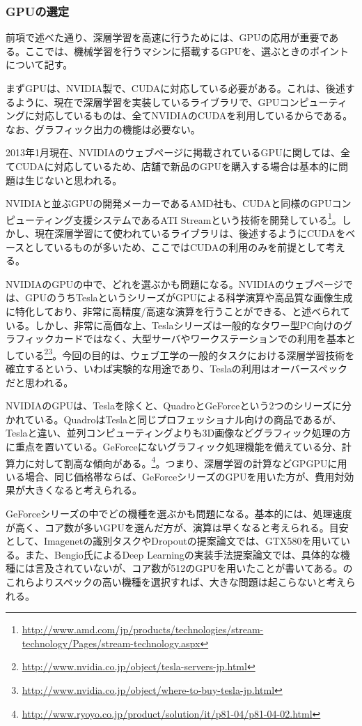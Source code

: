 \subsubsection{GPUの選定}
前項で述べた通り、深層学習を高速に行うためには、GPUの応用が重要である。ここでは、機械学習を行うマシンに搭載するGPUを、選ぶときのポイントについて記す。\par
まずGPUは、NVIDIA製で、CUDAに対応している必要がある。これは、後述するように、現在で深層学習を実装しているライブラリで、GPUコンピューティングに対応しているものは、全てNVIDIAのCUDAを利用しているからである。なお、グラフィック出力の機能は必要ない。\par2013年1月現在、NVIDIAのウェブページに掲載されているGPUに関しては、全てCUDAに対応しているため、店舗で新品のGPUを購入する場合は基本的に問題は生じないと思われる。\par
NVIDIAと並ぶGPUの開発メーカーであるAMD社も、CUDAと同様のGPUコンピューティング支援システムであるATI Streamという技術を開発している\footnote{\url{http://www.amd.com/jp/products/technologies/stream-technology/Pages/stream-technology.aspx}}。しかし、現在深層学習にて使われているライブラリは、後述するようにCUDAをベースとしているものが多いため、ここではCUDAの利用のみを前提として考える。\par
NVIDIAのGPUの中で、どれを選ぶかも問題になる。NVIDIAのウェブページでは、GPUのうちTeslaというシリーズがGPUによる科学演算や高品質な画像生成に特化しており、非常に高精度/高速な演算を行うことができる、と述べられている。しかし、非常に高価な上、Teslaシリーズは一般的なタワー型PC向けのグラフィックカードではなく、大型サーバやワークステーションでの利用を基本としている\footnote{\url{http://www.nvidia.co.jp/object/tesla-servers-jp.html}}\footnote{\url{http://www.nvidia.co.jp/object/where-to-buy-tesla-jp.html}}。今回の目的は、ウェブ工学の一般的タスクにおける深層学習技術を確立するという、いわば実験的な用途であり、Teslaの利用はオーバースペックだと思われる。\par
NVIDIAのGPUは、Teslaを除くと、QuadroとGeForceという2つのシリーズに分かれている。QuadroはTeslaと同じプロフェッショナル向けの商品であるが、Teslaと違い、並列コンピューティングよりも3D画像などグラフィック処理の方に重点を置いている。GeForceにないグラフィック処理機能を備えている分、計算力に対して割高な傾向がある。\footnote{\url{http://www.ryoyo.co.jp/product/solution/it/p81-04/p81-04-02.html}}。つまり、深層学習の計算などGPGPUに用いる場合、同じ価格帯ならば、GeForceシリーズのGPUを用いた方が、費用対効果が大きくなると考えられる。\par
GeForceシリーズの中でどの機種を選ぶかも問題になる。基本的には、処理速度が高く、コア数が多いGPUを選んだ方が、演算は早くなると考えられる。目安として、Imagenetの識別タスク\cite{krizhevsky2012imagenet}やDropoutの提案論文\cite{hinton2012improving}では、GTX580を用いている。また、Bengio氏によるDeep Learningの実装手法提案論文\cite{bengio2012practical}では、具体的な機種には言及されていないが、コア数が512のGPUを用いたことが書いてある。のこれらよりスペックの高い機種を選択すれば、大きな問題は起こらないと考えられる。


